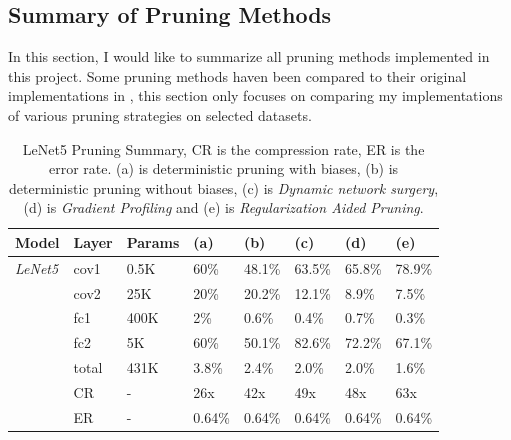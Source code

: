 \documentclass[a4paper,12pt]{report}
\begin{document}
\subsection{Summary of Pruning Methods}
\label{sec:pruning_sum}
In this section, I would like to summarize all pruning methods implemented in
this project.
Some pruning methods haven been compared to their original implementations in
, this section only focuses on comparing my implementations
of various pruning strategies on selected datasets.



\begin{table}[!h]
  \centering
  \begin{tabular}{llllllll}
    \hline
    Model   &Layer     &Params    &(a)    &(b)      &(c)    &(d)      &(e)\\
    \hline
    \textit{LeNet5}  &cov1     &0.5K       &60\%   &48.1\%   &63.5\% &65.8\%   &78.9\%\\
            &cov2     &25K        &20\%   &20.2\%   &12.1\% &8.9\%    &7.5\%\\
            &fc1      &400K       &2\%    &0.6\%    &0.4\%  &0.7\%    &0.3\%\\
            &fc2      &5K         &60\%   &50.1\%   &82.6\% &72.2\%   &67.1\%\\
            &total    &431K       &3.8\%  &2.4\%    &2.0\%  &2.0\%    &1.6\%\\
    \hline

            &CR       &-          &26x     &42x       &49x  &48x      &63x\\
            &ER       &-          &0.64\%  &0.64\%    &0.64\% &0.64\% &0.64\%\\
    \hline
  \end{tabular}
  \caption{LeNet5 Pruning Summary, CR is the compression
  rate, ER is the error rate. (a) is deterministic pruning with biases, (b) is
  deterministic pruning without biases, (c) is \textit{Dynamic network surgery},
  (d) is \textit{Gradient Profiling} and (e) is \textit{Regularization Aided Pruning}.}
  \label{fig:prune_new_summary}
\end{table}
\end{document}
